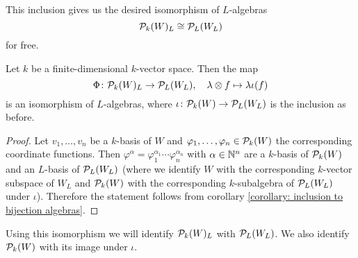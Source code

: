 This inclusion gives us the desired isomorphism of $L$-algebras
\[
        \mathcal{P}_k(W)_L
  \cong \mathcal{P}_L(W_L)
\]
for free.


\begin{proposition}
  Let $k$ be a finite-dimensional $k$-vector space.
  Then the map
  \[
            \Phi
    \colon  \mathcal{P}_k(W)_L
    \to     \mathcal{P}_L(W_L),
    \quad   \lambda \otimes f
    \mapsto \lambda \iota(f)
  \]
  is an isomorphism of $L$-algebras, where $\iota \colon \mathcal{P}_k(W) \to \mathcal{P}_L(W_L)$ is the inclusion as before.
\end{proposition}
\begin{proof}
  Let $v_1, \dotsc, v_n$ be a $k$-basis of $W$ and $\varphi_1, \dotsc, \varphi_n \in \mathcal{P}_k(W)$ the corresponding coordinate functions.
  Then $\varphi^\alpha = \varphi_1^{\alpha_1} \dotsm \varphi_n^{\alpha_n}$ with $\alpha \in \mathbb{N}^n$ are a $k$-basis of $\mathcal{P}_k(W)$ and an $L$-basis of $\mathcal{P}_L(W_L)$ (where we identify $W$ with the corresponding $k$-vector subspace of $W_L$ and $\mathcal{P}_k(W)$ with the corresponding $k$-subalgebra of $\mathcal{P}_L(W_L)$ under $\iota$).
  Therefore the statement follows from corollary \ref{corollary: inclusion to bijection algebras}.
\end{proof}


Using this isomorphism we will identify $\mathcal{P}_k(W)_L$ with $\mathcal{P}_L(W_L)$.
We also identify $\mathcal{P}_k(W)$ with its image under $\iota$.


